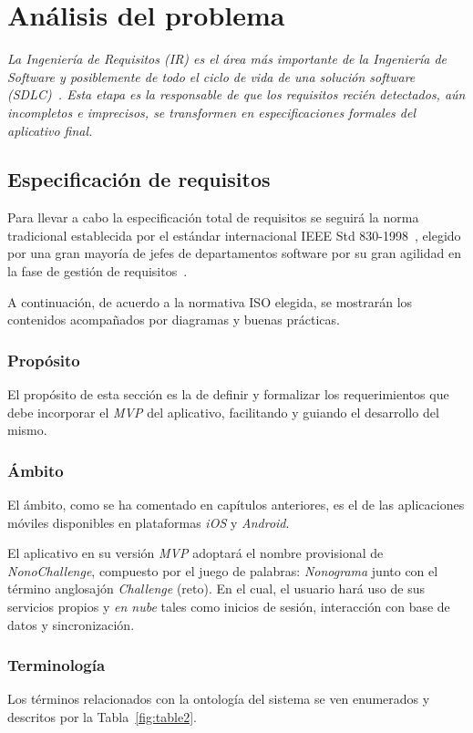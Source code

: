 \chapter{Análisis del problema}
\textit{La Ingeniería de Requisitos (IR) es el área más importante de la Ingeniería de Software y posiblemente de todo el 
ciclo de vida de una solución software (SDLC)~\cite{chakraboty2012requirements}. Esta etapa es la responsable de que los 
requisitos recién detectados, aún incompletos e imprecisos, se transformen en especificaciones formales del aplicativo final.}

\section{Especificación de requisitos}
Para llevar a cabo la especificación total de requisitos se seguirá la norma tradicional establecida por el estándar internacional 
IEEE Std 830-1998~\cite{8559686}, elegido por una gran mayoría de jefes de departamentos software por su gran agilidad en la fase de gestión 
de requisitos~\cite{guzman2018impacto}.

A continuación, de acuerdo a la normativa ISO elegida, se mostrarán los contenidos acompañados por diagramas y buenas prácticas.

\subsection{Propósito}
El propósito de esta sección es la de definir y formalizar los requerimientos que debe incorporar el \textit{MVP} del aplicativo, facilitando
y guiando el desarrollo del mismo.

\subsection{Ámbito}
El ámbito, como se ha comentado en capítulos anteriores, es el de las aplicaciones móviles disponibles en plataformas \textit{iOS} y 
\textit{Android}.

El aplicativo en su versión \textit{MVP} adoptará el nombre provisional de \textit{NonoChallenge}, compuesto por el juego de palabras:
 \textit{Nonograma} junto con el término anglosajón \textit{Challenge} (reto).
En el cual, el usuario hará uso de sus servicios propios y \textit{en nube} tales como inicios de sesión, interacción con base de datos y
sincronización.

\subsection{Terminología}
Los términos relacionados con la ontología del sistema se ven enumerados y descritos por la Tabla~\ref{fig:table2}.

